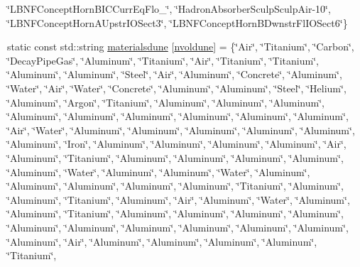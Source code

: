 \begin{DoxyCompactItemize}
\char`\"{}L\-B\-N\-F\-Concept\-Horn\-B\-I\-C\-Curr\-Eq\-Flo\-\_\char`\"{}, \char`\"{}Hadron\-Absorber\-Sculp\-Sculp\-Air-\/10\char`\"{}, \char`\"{}L\-B\-N\-F\-Concept\-Horn\-A\-Upstr\-I\-O\-Sect3\char`\"{}, \char`\"{}L\-B\-N\-F\-Concept\-Horn\-B\-Dwnstr\-Fl\-I\-O\-Sect6\char`\"{}\}
\item 
static const std\-::string \hyperlink{namespace_i_map_a6e11349f323934513bd947fcc7f71c28}{materialsdune} \mbox{[}\hyperlink{namespace_i_map_a1c9b3e0953e2482ba19063292d111bb2}{nvoldune}\mbox{]} = \{\char`\"{}Air\char`\"{}, \char`\"{}Titanium\char`\"{}, \char`\"{}Carbon\char`\"{}, \char`\"{}Decay\-Pipe\-Gas\char`\"{}, \char`\"{}Aluminum\char`\"{}, \char`\"{}Titanium\char`\"{}, \char`\"{}Air\char`\"{}, \char`\"{}Titanium\char`\"{}, \char`\"{}Titanium\char`\"{}, \char`\"{}Aluminum\char`\"{}, \char`\"{}Aluminum\char`\"{}, \char`\"{}Steel\char`\"{}, \char`\"{}Air\char`\"{}, \char`\"{}Aluminum\char`\"{}, \char`\"{}Concrete\char`\"{}, \char`\"{}Aluminum\char`\"{}, \char`\"{}Water\char`\"{}, \char`\"{}Air\char`\"{}, \char`\"{}Water\char`\"{}, \char`\"{}Concrete\char`\"{}, \char`\"{}Aluminum\char`\"{}, \char`\"{}Aluminum\char`\"{}, \char`\"{}Steel\char`\"{}, \char`\"{}Helium\char`\"{}, \char`\"{}Aluminum\char`\"{}, \char`\"{}Argon\char`\"{}, \char`\"{}Titanium\char`\"{}, \char`\"{}Aluminum\char`\"{}, \char`\"{}Aluminum\char`\"{}, \char`\"{}Aluminum\char`\"{}, \char`\"{}Aluminum\char`\"{}, \char`\"{}Aluminum\char`\"{}, \char`\"{}Aluminum\char`\"{}, \char`\"{}Aluminum\char`\"{}, \char`\"{}Aluminum\char`\"{}, \char`\"{}Aluminum\char`\"{}, \char`\"{}Air\char`\"{}, \char`\"{}Water\char`\"{}, \char`\"{}Aluminum\char`\"{}, \char`\"{}Aluminum\char`\"{}, \char`\"{}Aluminum\char`\"{}, \char`\"{}Aluminum\char`\"{}, \char`\"{}Aluminum\char`\"{}, \char`\"{}Aluminum\char`\"{}, \char`\"{}Iron\char`\"{}, \char`\"{}Aluminum\char`\"{}, \char`\"{}Aluminum\char`\"{}, \char`\"{}Aluminum\char`\"{}, \char`\"{}Aluminum\char`\"{}, \char`\"{}Air\char`\"{}, \char`\"{}Aluminum\char`\"{}, \char`\"{}Titanium\char`\"{}, \char`\"{}Aluminum\char`\"{}, \char`\"{}Aluminum\char`\"{}, \char`\"{}Aluminum\char`\"{}, \char`\"{}Aluminum\char`\"{}, \char`\"{}Aluminum\char`\"{}, \char`\"{}Water\char`\"{}, \char`\"{}Aluminum\char`\"{}, \char`\"{}Aluminum\char`\"{}, \char`\"{}Water\char`\"{}, \char`\"{}Aluminum\char`\"{}, \char`\"{}Aluminum\char`\"{}, \char`\"{}Aluminum\char`\"{}, \char`\"{}Aluminum\char`\"{}, \char`\"{}Aluminum\char`\"{}, \char`\"{}Titanium\char`\"{}, \char`\"{}Aluminum\char`\"{}, \char`\"{}Aluminum\char`\"{}, \char`\"{}Titanium\char`\"{}, \char`\"{}Aluminum\char`\"{}, \char`\"{}Air\char`\"{}, \char`\"{}Aluminum\char`\"{}, \char`\"{}Water\char`\"{}, \char`\"{}Aluminum\char`\"{}, \char`\"{}Aluminum\char`\"{}, \char`\"{}Titanium\char`\"{}, \char`\"{}Aluminum\char`\"{}, \char`\"{}Aluminum\char`\"{}, \char`\"{}Aluminum\char`\"{}, \char`\"{}Aluminum\char`\"{}, \char`\"{}Aluminum\char`\"{}, \char`\"{}Aluminum\char`\"{}, \char`\"{}Aluminum\char`\"{}, \char`\"{}Aluminum\char`\"{}, \char`\"{}Aluminum\char`\"{}, \char`\"{}Aluminum\char`\"{}, \char`\"{}Aluminum\char`\"{}, \char`\"{}Air\char`\"{}, \char`\"{}Aluminum\char`\"{}, \char`\"{}Aluminum\char`\"{}, \char`\"{}Aluminum\char`\"{}, \char`\"{}Aluminum\char`\"{}, \char`\"{}Titanium\char`\"{}, 
\end{DoxyCompactItemize}
